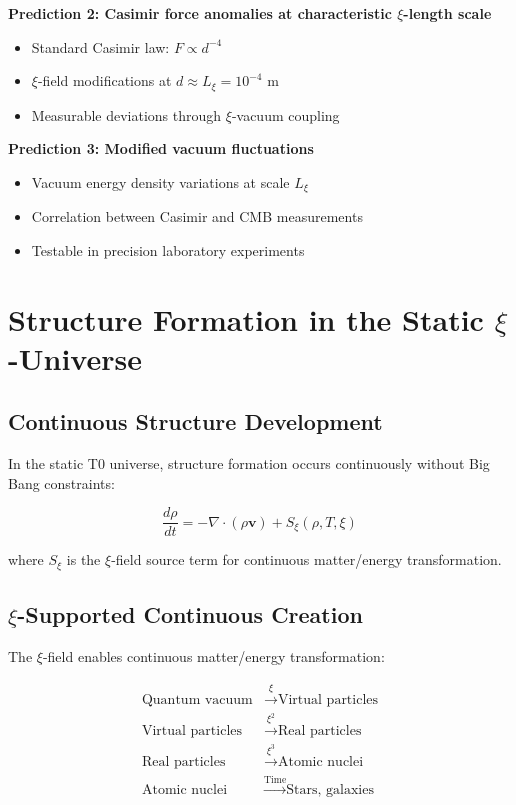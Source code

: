 \documentclass[12pt,a4paper]{article}
\theoremstyle{definition}
\theoremstyle{remark}
\begin{document}
	\textbf{Prediction 2: Casimir force anomalies at characteristic $\xi$-length scale}
	\begin{itemize}
		\item Standard Casimir law: $F \propto d^{-4}$
		\item $\xi$-field modifications at $d \approx L_\xi = 10^{-4}$ m
		\item Measurable deviations through $\xi$-vacuum coupling
	\end{itemize}
	
	\textbf{Prediction 3: Modified vacuum fluctuations}
	\begin{itemize}
		\item Vacuum energy density variations at scale $L_\xi$
		\item Correlation between Casimir and CMB measurements
		\item Testable in precision laboratory experiments
	\end{itemize}
	
	\section{Structure Formation in the Static $\xi$-Universe}
	
	\subsection{Continuous Structure Development}
	
	In the static T0 universe, structure formation occurs continuously without Big Bang constraints:
	
	\begin{equation}
		\frac{d\rho}{dt} = -\nabla \cdot (\rho \mathbf{v}) + S_\xi(\rho, T, \xi)
	\end{equation}
	
	where $S_\xi$ is the $\xi$-field source term for continuous matter/energy transformation.
	
	\subsection{$\xi$-Supported Continuous Creation}
	
	The $\xi$-field enables continuous matter/energy transformation:
	
	\begin{align}
		\text{Quantum vacuum} &\xrightarrow{\xi} \text{Virtual particles} \\
		\text{Virtual particles} &\xrightarrow{\xi^2} \text{Real particles} \\
		\text{Real particles} &\xrightarrow{\xi^3} \text{Atomic nuclei} \\
		\text{Atomic nuclei} &\xrightarrow{\text{Time}} \text{Stars, galaxies}
	\end{align}
	
\end{document}
